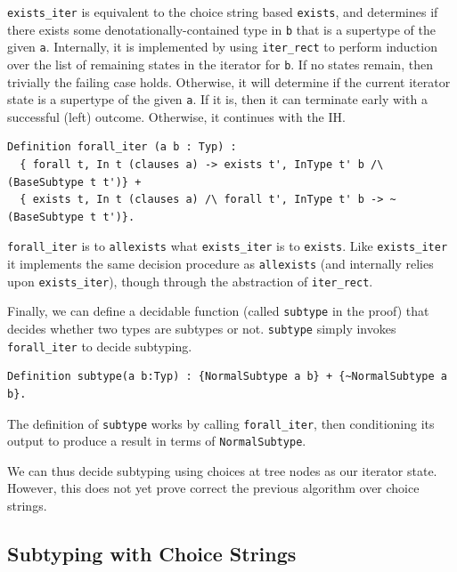 \documentclass[a4paper,english]{lipics-v2019}
\begin{document}
\verb|exists_iter| is equivalent to the choice string based \verb|exists|,
and determines if there exists some denotationally-contained type in \verb|b|
that is a supertype of the given \verb|a|. Internally, it is implemented by 
using \verb|iter_rect| to perform induction over the list of remaining states in
the iterator for \verb|b|. If no states remain, then trivially the failing case holds.
Otherwise, it will determine if the current iterator state is a supertype of the given
\verb|a|. If it is, then it can terminate early with a successful (left) outcome. Otherwise,
it continues with the IH.

\begin{small}\begin{verbatim}
Definition forall_iter (a b : Typ) :
  { forall t, In t (clauses a) -> exists t', InType t' b /\ (BaseSubtype t t')} +
  { exists t, In t (clauses a) /\ forall t', InType t' b -> ~ (BaseSubtype t t')}.
\end{verbatim}\end{small}

\verb|forall_iter| is to \verb|allexists| what \verb|exists_iter| is to
\verb|exists|. Like \verb|exists_iter| it implements the same decision procedure
as \verb|allexists| (and internally relies upon \verb|exists_iter|), though through
the abstraction of \verb|iter_rect|.

Finally, we can define a decidable function (called \verb|subtype| in the proof)
that decides whether two types are subtypes or not. \verb|subtype| simply invokes
\verb|forall_iter| to decide subtyping.

\begin{small}\begin{verbatim}
Definition subtype(a b:Typ) : {NormalSubtype a b} + {~NormalSubtype a b}.
\end{verbatim}\end{small}

\noindent The definition of \verb|subtype| works by calling \verb|forall_iter|, then
conditioning its output to produce a result in terms of \verb|NormalSubtype|. 

We can thus decide subtyping using choices at tree nodes as our iterator state.
However, this does not yet prove correct the previous algorithm over choice strings.

\subsection{Subtyping with Choice Strings}
\end{document}
